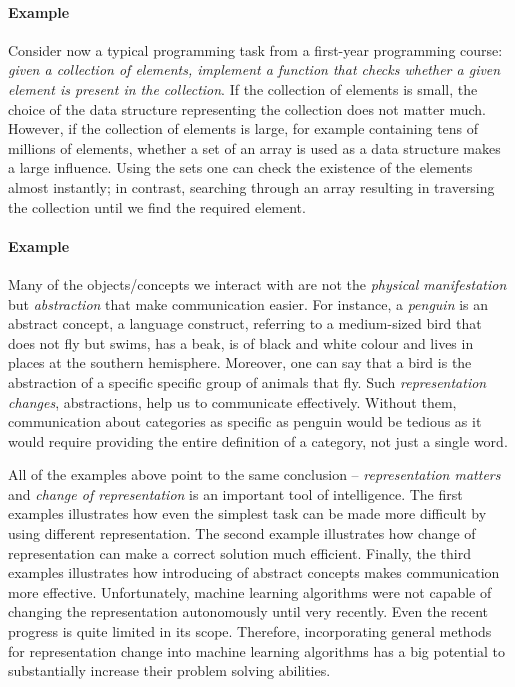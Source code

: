 \paragraph{Example} Consider now a typical programming task from a first-year programming course: \textit{given a collection of elements, implement a function that checks whether a given element is present in the collection}.
If the collection of elements is small, the choice of the data structure representing the collection does not matter much.
However, if the collection of elements is large, for example containing tens of millions of elements, whether a set of an array is used as a data structure makes a large influence.
Using the sets one can check the existence of the elements almost instantly; in contrast, searching through an array resulting in traversing the collection until we find the required element.



\paragraph{Example} 
Many of the objects/concepts we interact with are not the \textit{physical manifestation} but \textit{abstraction} that make communication easier.
For instance, a \textit{penguin} is an abstract concept, a language construct, referring to a medium-sized bird that does not fly but swims, has a beak, is of black and white colour and lives in places at the southern hemisphere.
Moreover, one can say that a bird is the abstraction of a specific specific group of animals that fly.
Such \textit{representation changes}, abstractions, help us to communicate effectively.
Without them, communication about categories as specific as penguin would be tedious as it would  require providing the entire definition of a category, not just a single word.




All of the examples above point to the same conclusion -- \textit{representation matters} and \textit{change of representation} is an important tool of intelligence.
The first examples illustrates how even the simplest task can be made more difficult by using different representation.
The second example illustrates how change of representation can make a correct solution much efficient.
Finally, the third examples illustrates how introducing of abstract concepts makes communication more effective.
Unfortunately, machine learning algorithms were not capable of changing the representation autonomously until very recently.
Even the recent progress is quite limited in its scope.
Therefore, incorporating general methods for representation change into machine learning algorithms has a big potential to substantially increase their problem solving abilities.






